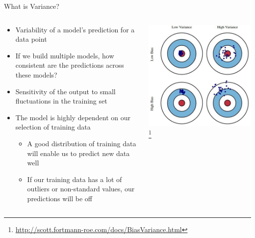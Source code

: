 \documentclass[aspectratio=169]{beamer}
\begin{document}
\begin{frame}{What is Variance?}

\begin{columns}
\begin{column}{0.5\textwidth}
\begin{itemize}
\item Variability of a model's prediction for a data point
\item If we build multiple models, how consistent are the predictions across these models?
\item Sensitivity of the output to small fluctuations in the training set
\item The model is highly dependent on our selection of training data
	\begin{itemize}
	\item A good distribution of training data will enable us to predict new data well
	\item If our training data has a lot of outliers or non-standard values, our predictions will be off
	\end{itemize}
\end{itemize}
\end{column}
\begin{column}{0.5\textwidth}
\includegraphics[width=1\textwidth]{./lectReg/bias-and-variance.jpg}
\footnote{\url{http://scott.fortmann-roe.com/docs/BiasVariance.html}}
\end{column}
\end{columns}
\end{frame}
\end{document}
